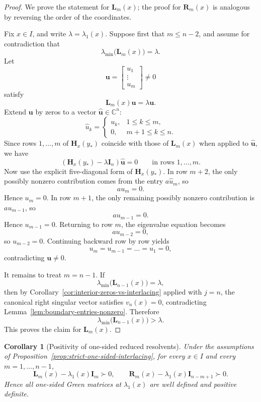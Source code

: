 \documentclass[11pt]{article}
\newtheorem{corollary}[theorem]{Corollary}
\begin{document}
\begin{proof}
We prove the statement for \(\mathbf L_m(x)\); the proof for \(\mathbf R_m(x)\) is analogous by reversing the order of the coordinates.

Fix \(x\in I\), and write \(\lambda=\lambda_1(x)\). Suppose first that \(m\le n-2\), and assume for contradiction that
\[
\lambda_{\min}\bigl(\mathbf L_m(x)\bigr)=\lambda.
\]
Let
\[
\mathbf u=
\begin{bmatrix}
u_1\\ \vdots\\ u_m
\end{bmatrix}\neq 0
\]
satisfy
\[
\mathbf L_m(x)\mathbf u=\lambda \mathbf u.
\]
Extend \(\mathbf u\) by zeros to a vector \(\widehat{\mathbf u}\in\mathbb C^n\):
\[
\widehat u_k=
\begin{cases}
u_k,&1\le k\le m,\\
0,&m+1\le k\le n.
\end{cases}
\]
Since rows \(1,\dots,m\) of \(\mathbf H_x(y_*)\) coincide with those of \(\mathbf L_m(x)\) when applied to \(\widehat{\mathbf u}\), we have
\[
(\mathbf H_x(y_*)-\lambda \mathbf I_n)\widehat{\mathbf u}=0
\qquad\text{in rows }1,\dots,m.
\]
Now use the explicit five-diagonal form of \(\mathbf H_x(y_*)\). In row \(m+2\), the only possibly nonzero contribution comes from the entry \(a\widehat u_m\), so
\[
a u_m=0.
\]
Hence \(u_m=0\). In row \(m+1\), the only remaining possibly nonzero contribution is \(a u_{m-1}\), so
\[
a u_{m-1}=0.
\]
Hence \(u_{m-1}=0\). Returning to row \(m\), the eigenvalue equation becomes
\[
a u_{m-2}=0,
\]
so \(u_{m-2}=0\). Continuing backward row by row yields
\[
u_m=u_{m-1}=\dots=u_1=0,
\]
contradicting \(\mathbf u\neq 0\).

It remains to treat \(m=n-1\). If
\[
\lambda_{\min}\bigl(\mathbf L_{n-1}(x)\bigr)=\lambda,
\]
then by Corollary~\ref{cor:interior-zeros-vs-interlacing} applied with \(j=n\), the canonical right singular vector satisfies \(v_n(x)=0\), contradicting Lemma~\ref{lem:boundary-entries-nonzero}. Therefore
\[
\lambda_{\min}\bigl(\mathbf L_{n-1}(x)\bigr)>\lambda.
\]
This proves the claim for \(\mathbf L_m(x)\).
\end{proof}

\begin{corollary}[Positivity of one-sided reduced resolvents]\label{cor:one-sided-resolvents}
Under the assumptions of Proposition~\ref{prop:strict-one-sided-interlacing}, for every \(x\in I\) and every \(m=1,\dots,n-1\),
\[
\mathbf L_m(x)-\lambda_1(x)\mathbf I_m \succ 0,
\qquad
\mathbf R_m(x)-\lambda_1(x)\mathbf I_{n-m+1} \succ 0.
\]
Hence all one-sided Green matrices at \(\lambda_1(x)\) are well defined and positive definite.
\end{corollary}
\end{document}
